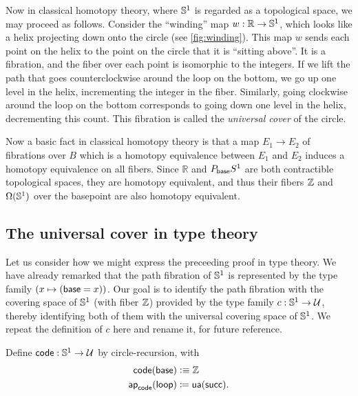 Now in classical homotopy theory, where $\mathbb{S}^1$ is regarded as a topological space, we may proceed as follows.
Consider the ``winding'' map $w:\mathbb{R}\to \mathbb{S} ^1$, which looks like a helix projecting down onto the circle (see \autoref{fig:winding}).
This map $w$ sends each point on the helix to the point on the circle that it is ``sitting above''.
It is a fibration, and the fiber over each point is isomorphic to the integers.
If we lift the path that goes counterclockwise around the loop on the bottom, we go up one level in the helix, incrementing the integer in the fiber.
Similarly, going clockwise around the loop on the bottom corresponds to going down one level in the helix, decrementing this count.
This fibration is called the \emph{universal cover} of the circle.

Now a basic fact in classical homotopy theory is that a map $E_1\to E_2$ of fibrations over $B$ which is a homotopy equivalence between $E_1$ and $E_2$ induces a homotopy equivalence on all fibers.
Since $\mathbb{R}$ and $P_{\mathsf{base}} S^1$ are both contractible topological spaces, they are homotopy equivalent, and thus their fibers $\mathbb{Z}$ and $\Omega(\mathbb{S} ^1)$ over the basepoint are also homotopy equivalent.

\subsection{The universal cover in type theory}
\label{sec:pi1s1-universal-cover}

Let us consider how we might express the preceeding proof in type theory.
We have already remarked that the path fibration of $\mathbb{S}^1$ is represented by the type family $(x\mapsto (\mathsf{base}=x))$.
Our goal is to identify the path fibration with the covering space of $\mathbb{S}^1$ (with fiber $\mathbb{Z}$) provided by the type family $c:\mathbb{S}^1\to\mathcal{U}$,
thereby identifying both of them with the universal covering space of $\mathbb{S}^1$.
We repeat the definition of $c$ here and rename it, for future reference.

\begin{defn} \label{S1-universal-cover}
  Define $\mathsf{code} : \mathbb{S} ^1 \to \mathcal{U}$ by circle-recursion, with 
  \begin{align*}
    \mathsf{code}(\mathsf{base}) &\vcentcolon\equiv \mathbb{Z} \\
    \mathsf{ap}_{\mathsf{code}}({\mathsf{loop}}) &\coloneqq \mathsf{ua}(\mathsf{succ}).
  \end{align*}
\end{defn}

